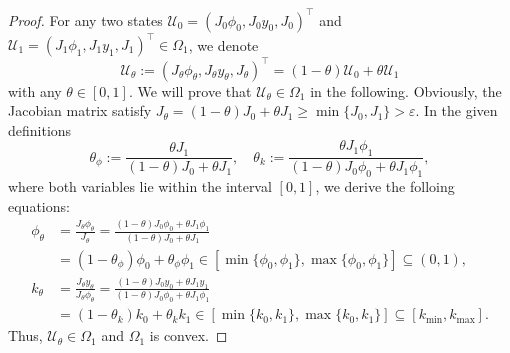 \documentclass[times,final,11pt]{elsarticle}
\numberwithin{equation}{section}
\theoremstyle{definition}
\theoremstyle{remark}
\begin{document}
\begin{proof}
	For any two states $\boldsymbol{\mathcal{U}}_0 = (J_0\phi_0, J_0y_0, J_0)^\top$ and $\boldsymbol{\mathcal{U}}_1 = (J_1\phi_1, J_1y_1, J_1)^\top \in \Omega_1$, we denote 
	\begin{equation*}
		\boldsymbol{\mathcal{U}}_\theta := (J_\theta\phi_\theta, J_\theta y_\theta, J_\theta)^\top = (1 - \theta)\boldsymbol{\mathcal{U}}_0 + \theta\boldsymbol{\mathcal{U}}_1
	\end{equation*}
	with any $\theta \in [0, 1]$. We will prove that $\boldsymbol{\mathcal{U}}_\theta \in \Omega_1$ in the following. Obviously, the Jacobian matrix satisfy $J_\theta = (1 - \theta)J_0 + \theta J_1 \geq \min \{J_0, J_1\} > \varepsilon$. In the given definitions 
	\begin{equation*}
		\theta_\phi := \frac{\theta J_1}{(1 - \theta)J_0+ \theta J_1}, \quad \theta_k := \frac{\theta J_1 \phi_1}{(1 - \theta)J_0\phi_0 + \theta J_1\phi_1},
	\end{equation*}
	where both variables lie within the interval $[0, 1]$, we derive the folloing equations:
	\begin{equation*}
		\begin{aligned}
			\phi_\theta &= \frac{J_\theta \phi_\theta}{J_\theta} = \frac{(1 - \theta)J_0\phi_0 + \theta J_1\phi_1}{(1 - \theta)J_0+ \theta J_1} \\
			& = (1 - \theta_\phi) \phi_0 + \theta_\phi \phi_1 \in \left[\min \{\phi_0, \phi_1\}, \max \{\phi_0, \phi_1\} \right] \subseteq (0, 1),\\
			k_\theta &= \frac{J_\theta y_\theta}{J_\theta \phi_\theta} = \frac{(1 - \theta)J_0 y_0 + \theta J_1 y_1}{(1 - \theta)J_0\phi_0 + \theta J_1\phi_1} \\
			&= (1 - \theta_k) k_0 + \theta_k k_1 \in \left[\min \{k_0, k_1\}, \max \{k_0, k_1\} \right] \subseteq [k_{\min}, k_{\max}].
		\end{aligned}
	\end{equation*}
	Thus, $\boldsymbol{\mathcal{U}}_\theta \in \Omega_1$ and $\Omega_1$ is convex.


\end{proof}
\end{document}
